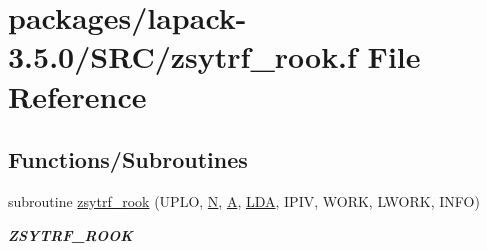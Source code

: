 \hypertarget{zsytrf__rook_8f}{}\section{packages/lapack-\/3.5.0/\+S\+R\+C/zsytrf\+\_\+rook.f File Reference}
\label{zsytrf__rook_8f}
\subsection*{Functions/\+Subroutines}
\begin{DoxyCompactItemize}
\item 
subroutine \hyperlink{group__complex16SYcomputational_gaf4ad2d881bbc00fdd2b851e9085b51e6}{zsytrf\+\_\+rook} (U\+P\+L\+O, \hyperlink{polmisc_8c_a0240ac851181b84ac374872dc5434ee4}{N}, \hyperlink{classA}{A}, \hyperlink{example__user_8c_ae946da542ce0db94dced19b2ecefd1aa}{L\+D\+A}, I\+P\+I\+V, W\+O\+R\+K, L\+W\+O\+R\+K, I\+N\+F\+O)
\begin{DoxyCompactList}\small\item\em {\bfseries Z\+S\+Y\+T\+R\+F\+\_\+\+R\+O\+O\+K} \end{DoxyCompactList}\end{DoxyCompactItemize}
